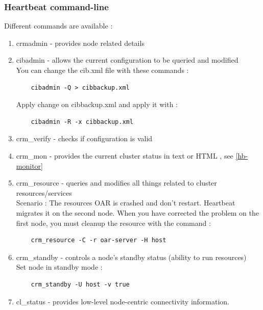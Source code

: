 \documentclass[a4paper,10pt]{report}
\begin{document}
\subsubsection{Heartbeat command-line}
\label{hb-command}
Different commands are available : 
\begin{enumerate}
 \item crmadmin - provides node related details 
 \item cibadmin - allows the current configuration to be queried and modified \\
    You can change the cib.xml file with these commands :
    \begin{lstlisting}
    cibadmin -Q > cibbackup.xml 
    \end{lstlisting}
  Apply change on cibbackup.xml and apply it with :
    \begin{lstlisting}
    cibadmin -R -x cibbackup.xml 
    \end{lstlisting}

 \item crm\_verify - checks if configuration is valid 
 \item crm\_mon - provides the current cluster status in text or HTML , see \ref{hb-monitor}
 \item crm\_resource - queries and modifies all things related to cluster resources/services\\
    Scenario : The resources OAR is crashed and don't restart. Heartbeat migrates it on the second node. When you have corrected the problem on the first node, you must cleanup the resource with the command :
    \begin{lstlisting}
    crm_resource -C -r oar-server -H host
    \end{lstlisting}
 \item crm\_standby - controls a node's standby status (ability to run resources) \\
    Set node in standby mode :
    \begin{lstlisting}
    crm_standby -U host -v true 
    \end{lstlisting}
 \item cl\_status - provides low-level node-centric connectivity information. 
\end{enumerate}
\end{document}
